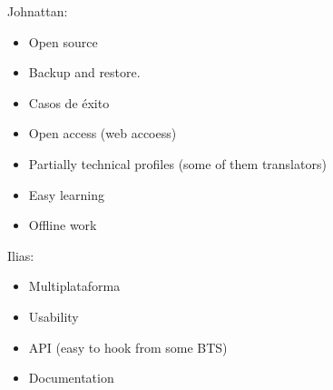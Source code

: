 \documentclass[11pt]{scrartcl}
\begin{document}
Johnattan:
\begin{itemize}
    \item Open source
    \item Backup and restore.
    \item Casos de éxito
    \item Open access (web accoess)
    \item Partially technical profiles (some of them translators)
    \item Easy learning
    \item Offline work
\end{itemize}

Ilias:
\begin{itemize}
    \item Multiplataforma
    \item Usability
    \item API (easy to hook from some BTS)
    \item Documentation
\end{itemize}
\end{document}
